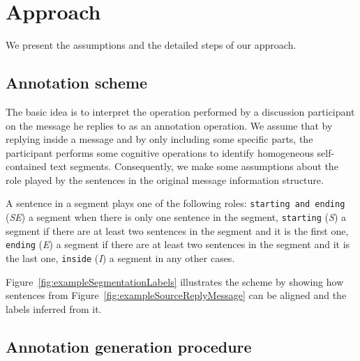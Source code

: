 
\section{Approach}
\label{sec:approach}

We present the assumptions and the detailed steps of our approach.

\subsection{Annotation scheme}
\label{sec:annotationscheme}

The basic idea is to interpret the operation performed by a discussion participant on the message he replies to as an annotation operation. 
%
% 
% 
We assume that by replying inside a message and by only including some specific parts, the participant performs some cognitive operations to identify homogeneous self-contained text segments.
% 
Consequently, we make some assumptions about the role played by the sentences in the original message information structure.

A sentence in a segment plays one of the following roles:
\texttt{\footnotesize starting and ending} (\textit{SE}) a segment when there is only one sentence in the segment, %
\texttt{\footnotesize starting} (\textit{S}) a segment if there are at least two sentences in the segment and it is the first one, %
\texttt{\footnotesize ending} (\textit{E}) a segment if there are at least two sentences in the segment and it is the last one, %
\texttt{\footnotesize inside} (\textit{I}) a segment in any other cases.

Figure~\ref{fig:exampleSegmentationLabels} illustrates the scheme by showing how sentences from Figure~\ref{fig:exampleSourceReplyMessage} can be aligned and the labels inferred from it. 
% 

\subsection{Annotation generation procedure}
\label{}

